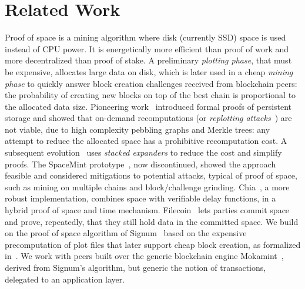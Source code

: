 \section{Related Work}\label{sec:related_work}

Proof of space is a mining algorithm where disk (currently SSD) space
is used instead of CPU power.
It is energetically more efficient than proof of work and
more decentralized than proof of stake.
A preliminary \emph{plotting phase}, that must be expensive, allocates large data on disk,
which is later used in a cheap
\emph{mining phase} to quickly answer
block creation challenges received from blockchain peers:
the probability of creating new blocks on top of the best chain
is proportional to the allocated data size.
Pioneering work~\cite{AtenieseBFG14,DziembowskiFKP15} introduced
formal proofs of persistent storage and showed that
on-demand recomputations (or \emph{replotting attacks}~\cite{BaigGP25}) are not viable,
due to high complexity pebbling graphs and Merkle trees:
any attempt to reduce the allocated space has a prohibitive recomputation cost.
A subsequent evolution~\cite{RenD16}
uses \emph{stacked expanders} to reduce the cost
and simplify proofs. The SpaceMint prototype~\cite{ParkKFGAP18},
now discontinued, showed the approach feasible and considered
mitigations to potential attacks, typical of
proof of space, such as mining on multiple chains and block/challenge grinding.
Chia~\cite{AbusalahACKPR17,CohenP19}, a more robust implementation, combines
space with verifiable delay functions, in a hybrid proof of space and time mechanism.
Filecoin~\cite{Fil24} lets parties commit space and prove, repeatedly,
that they still hold data in the committed space.
We build on the proof of space algorithm of Signum~\cite{signum}
based on the expensive precomputation of
plot files that later support cheap block creation, as formalized
in~\cite{Spoto25}. We work with peers built over the generic blockchain
engine Mokamint~\cite{mokamint-source-code},
derived from Signum's algorithm, but generic \wrt{} the
notion of transactions, delegated to an application layer.


